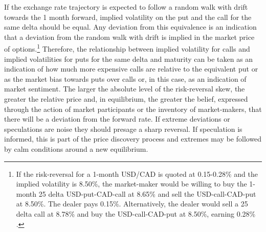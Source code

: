 \documentclass[12pt, a4paper, oneside]{article} %
\begin{document}
If the exchange rate trajectory is expected to follow a random walk with drift towards the 1 month forward, implied volatility on the put and the call for the same delta should be equal.  Any deviation from this equivalence is an indication that a deviation from the random walk with drift is implied in the market price of options.\footnote{If the risk-reversal for a 1-month USD/CAD is quoted at 0.15-0.28\% and the implied volatility is 8.50\%, the market-maker would be willing to buy the 1-month 25 delta USD-put-CAD-call at 8.65\% and sell the USD-call-CAD-put at 8.50\%.  The dealer pays 0.15\%.  Alternatively, the dealer would sell a 25 delta call at 8.78\% and buy the USD-call-CAD-put at 8.50\%, earning 0.28\% \citep{Global}. }  Therefore, the relationship between implied volatility for calls and implied volatilities for puts for the same delta and maturity can be taken as an indication of how much more expensive calls are relative to the equivalent put or as the market bias towards puts over calls or, in this case, as an indication of market sentiment.  The larger the absolute level of the risk-reversal skew, the greater the relative price and, in equilibrium, the greater the belief, expressed through the action of market participants or the inventory of market-makers, that there will be a deviation from the forward rate.   If extreme deviations or speculations are noise they should presage a sharp reversal.  If speculation is informed, this is part of the price discovery process and extremes may be followed by calm conditions around a new equilibrium.  
  
\end{document}

